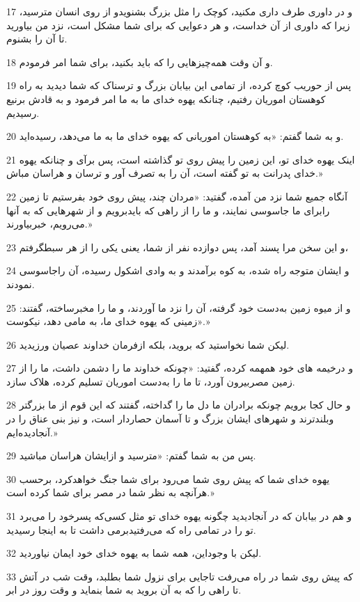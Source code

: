 \par 17 و در داوری طرف داری مکنید، کوچک را مثل بزرگ بشنویدو از روی انسان مترسید، زیرا که داوری از آن خداست، و هر دعوایی که برای شما مشکل است، نزد من بیاورید تا آن را بشنوم.
\par 18 و آن وقت همه‌چیزهایی را که باید بکنید، برای شما امر فرمودم.
\par 19 پس از حوریب کوچ کرده، از تمامی این بیابان بزرگ و ترسناک که شما دیدید به راه کوهستان اموریان رفتیم، چنانکه یهوه خدای ما به ما امر فرمود و به قادش برنیع رسیدیم.
\par 20 و به شما گفتم: «به کوهستان اموریانی که یهوه خدای ما به ما می‌دهد، رسیده‌اید.
\par 21 اینک یهوه خدای تو، این زمین را پیش روی تو گذاشته است، پس برآی و چنانکه یهوه خدای پدرانت به تو گفته است، آن را به تصرف آور و ترسان و هراسان مباش.»
\par 22 آنگاه جمیع شما نزد من آمده، گفتید: «مردان چند، پیش روی خود بفرستیم تا زمین رابرای ما جاسوسی نمایند، و ما را از راهی که بایدبرویم و از شهرهایی که به آنها می‌رویم، خبربیاورند.»
\par 23 و این سخن مرا پسند آمد، پس دوازده نفر از شما، یعنی یکی را از هر سبطگرفتم،
\par 24 و ایشان متوجه راه شده، به کوه برآمدند و به وادی اشکول رسیده، آن راجاسوسی نمودند.
\par 25 و از میوه زمین به‌دست خود گرفته، آن را نزد ما آوردند، و ما را مخبرساخته، گفتند: «زمینی که یهوه خدای ما، به مامی دهد، نیکوست.»
\par 26 لیکن شما نخواستید که بروید، بلکه ازفرمان خداوند عصیان ورزیدید.
\par 27 و درخیمه های خود همهمه کرده، گفتید: «چونکه خداوند ما را دشمن داشت، ما را از زمین مصربیرون آورد، تا ما را به‌دست اموریان تسلیم کرده، هلاک سازد.
\par 28 و حال کجا برویم چونکه برادران ما دل ما را گداخته، گفتند که این قوم از ما بزرگتر وبلندترند و شهرهای ایشان بزرگ و تا آسمان حصاردار است، و نیز بنی عناق را در آنجادیده‌ایم.»
\par 29 پس من به شما گفتم: «مترسید و ازایشان هراسان مباشید.
\par 30 یهوه خدای شما که پیش روی شما می‌رود برای شما جنگ خواهدکرد، برحسب هرآنچه به نظر شما در مصر برای شما کرده است.»
\par 31 و هم در بیابان که در آنجادیدید چگونه یهوه خدای تو مثل کسی‌که پسرخود را می‌برد تو را در تمامی راه که می‌رفتیدبرمی داشت تا به اینجا رسیدید.
\par 32 لیکن با وجوداین، همه شما به یهوه خدای خود ایمان نیاوردید.
\par 33 که پیش روی شما در راه می‌رفت تاجایی برای نزول شما بطلبد، وقت شب در آتش تا راهی را که به آن بروید به شما بنماید و وقت روز در ابر.
